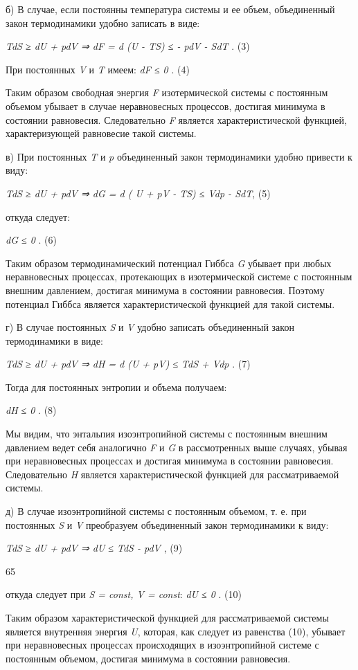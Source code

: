 б) В случае, если постоянны температура системы и ее объем, объединенный
закон термодинамики удобно записать в виде:

\emph{TdS ≥ dU + pdV ⇒ dF = d (U - TS) ≤ - pdV - SdT} . (3)

При постоянных \emph{V} и \emph{T} имеем: \emph{dF ≤ 0} . (4)

Таким образом свободная энергия \emph{F} изотермической системы с
постоянным объемом убывает в случае неравновесных процессов, достигая
минимума в состоянии равновесия. Следовательно \emph{F} является
характеристической функцией, характеризующей равновесие такой системы.

в) При постоянных \emph{T} и \emph{p} объединенный закон термодинамики
удобно привести к виду:

\emph{TdS ≥ dU + pdV ⇒ dG = d ( U + pV - TS) ≤ Vdp - SdT}, (5)

откуда следует:

\emph{dG ≤ 0} . (6)

Таким образом термодинамический потенциал Гиббса \emph{G} убывает при
любых неравновесных процессах, протекающих в изотермической системе с
постоянным внешним давлением, достигая минимума в состоянии равновесия.
Поэтому потенциал Гиббса является характеристической функцией для такой
системы.

г) В случае постоянных \emph{S} и \emph{V} удобно записать объединенный
закон термодинамики в виде:

\emph{TdS ≥ dU + pdV ⇒ dH = d (U + pV) ≤ TdS + Vdp} . (7)

Тогда для постоянных энтропии и объема получаем:

\emph{dH ≤ 0} . (8)

Мы видим, что энтальпия изоэнтропийной системы с постоянным внешним
давлением ведет себя аналогично \emph{F} и \emph{G} в рассмотренных выше
случаях, убывая при неравновесных процессах и достигая минимума в
состоянии равновесия. Следовательно \emph{H} является характеристической
функцией для рассматриваемой системы.

д) В случае изоэнтропийной системы с постоянным объемом, т. е. при
постоянных \emph{S} и \emph{V} преобразуем объединенный закон
термодинамики к виду:

\emph{TdS ≥ dU + pdV ⇒ dU ≤ TdS - pdV} , (9)

65

откуда следует при \emph{S = const, V = const}: \emph{dU ≤ 0} . (10)

Таким образом характеристической функцией для рассматриваемой системы
является внутренняя энергия \emph{U}, которая, как следует из равенства
(10), убывает при неравновесных процессах происходящих в изоэнтропийной
системе с постоянным объемом, достигая минимума в состоянии равновесия.

